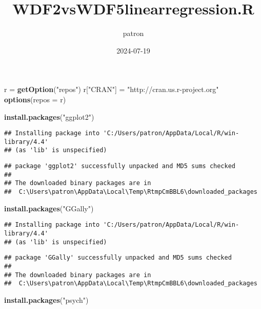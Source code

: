 \documentclass[
]{article}
\title{WDF2vsWDF5linearregression.R}
\author{patron}
\date{2024-07-19}
\newenvironment{Shaded}{\begin{snugshade}}{\end{snugshade}}
\newcommand{\AttributeTok}[1]{\textcolor[rgb]{0.13,0.29,0.53}{#1}}
\newcommand{\FunctionTok}[1]{\textcolor[rgb]{0.13,0.29,0.53}{\textbf{#1}}}
\newcommand{\NormalTok}[1]{#1}
\newcommand{\OtherTok}[1]{\textcolor[rgb]{0.56,0.35,0.01}{#1}}
\newcommand{\StringTok}[1]{\textcolor[rgb]{0.31,0.60,0.02}{#1}}
\begin{document}
\maketitle

\begin{Shaded}
\begin{Highlighting}[]
\NormalTok{r }\OtherTok{=} \FunctionTok{getOption}\NormalTok{(}\StringTok{"repos"}\NormalTok{)}
\NormalTok{r[}\StringTok{"CRAN"}\NormalTok{] }\OtherTok{=} \StringTok{"http://cran.us.r{-}project.org"}
\FunctionTok{options}\NormalTok{(}\AttributeTok{repos =}\NormalTok{ r)}

\FunctionTok{install.packages}\NormalTok{(}\StringTok{"ggplot2"}\NormalTok{)}
\end{Highlighting}
\end{Shaded}

\begin{verbatim}
## Installing package into 'C:/Users/patron/AppData/Local/R/win-library/4.4'
## (as 'lib' is unspecified)
\end{verbatim}

\begin{verbatim}
## package 'ggplot2' successfully unpacked and MD5 sums checked
## 
## The downloaded binary packages are in
##  C:\Users\patron\AppData\Local\Temp\RtmpCmBBL6\downloaded_packages
\end{verbatim}

\begin{Shaded}
\begin{Highlighting}[]
\FunctionTok{install.packages}\NormalTok{(}\StringTok{"GGally"}\NormalTok{)}
\end{Highlighting}
\end{Shaded}

\begin{verbatim}
## Installing package into 'C:/Users/patron/AppData/Local/R/win-library/4.4'
## (as 'lib' is unspecified)
\end{verbatim}

\begin{verbatim}
## package 'GGally' successfully unpacked and MD5 sums checked
## 
## The downloaded binary packages are in
##  C:\Users\patron\AppData\Local\Temp\RtmpCmBBL6\downloaded_packages
\end{verbatim}

\begin{Shaded}
\begin{Highlighting}[]
\FunctionTok{install.packages}\NormalTok{(}\StringTok{"psych"}\NormalTok{)}
\end{Highlighting}
\end{Shaded}
\end{document}
